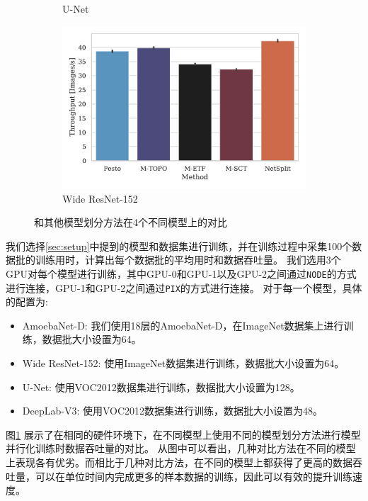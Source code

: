 \begin{figure}[ht]
\begin{subfigure}[b]{0.45\textwidth}
	  \caption{U-Net}
	\end{subfigure}
	\quad
	\begin{subfigure}[b]{0.45\textwidth}
	  \includegraphics[width=\textwidth]{./figure/5-evaluation/result-wide-resnet152.pdf}
	  \caption{Wide ResNet-152}
	\end{subfigure}
	\caption{\sys{}和其他模型划分方法在4个不同模型上的对比}
	\label{fig:result}
\end{figure}

我们选择\ref{sec:setup}中提到的模型和数据集进行训练，并在训练过程中采集100个数据批的训练用时，计算出每个数据批的平均用时和数据吞吐量。
我们选用3个GPU对每个模型进行训练，其中GPU-0和GPU-1以及GPU-2之间通过\texttt{NODE}的方式进行连接，GPU-1和GPU-2之间通过\texttt{PIX}的方式进行连接。
对于每一个模型，具体的配置为:
\begin{itemize}
	\item AmoebaNet-D: 我们使用18层的AmoebaNet-D，在ImageNet数据集上进行训练，数据批大小设置为64。
	\item Wide ResNet-152: 使用ImageNet数据集进行训练，数据批大小设置为64。
	\item U-Net: 使用VOC2012数据集进行训练，数据批大小设置为128。
	\item DeepLab-V3: 使用VOC2012数据集进行训练，数据批大小设置为48。
\end{itemize}

图\ref{fig:result} 展示了在相同的硬件环境下，在不同模型上使用不同的模型划分方法进行模型并行化训练时数据吞吐量的对比。
从图中可以看出，几种对比方法在不同的模型上表现各有优劣。而相比于几种对比方法，\sys{}在不同的模型上都获得了更高的数据吞吐量，可以在单位时间内完成更多的样本数据的训练，因此可以有效的提升训练速度。

